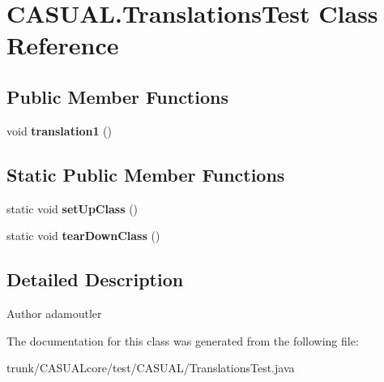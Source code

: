\hypertarget{classCASUAL_1_1TranslationsTest}{\section{C\-A\-S\-U\-A\-L.\-Translations\-Test Class Reference}
\label{classCASUAL_1_1TranslationsTest}
}
\subsection*{Public Member Functions}
\begin{DoxyCompactItemize}
\item 
\hypertarget{classCASUAL_1_1TranslationsTest_a7a0fd0a580f7479985835b31c4693fb4}{void {\bfseries translation1} ()}\label{classCASUAL_1_1TranslationsTest_a7a0fd0a580f7479985835b31c4693fb4}

\end{DoxyCompactItemize}
\subsection*{Static Public Member Functions}
\begin{DoxyCompactItemize}
\item 
\hypertarget{classCASUAL_1_1TranslationsTest_a996baecd9242ec89d7907086b88257dc}{static void {\bfseries set\-Up\-Class} ()}\label{classCASUAL_1_1TranslationsTest_a996baecd9242ec89d7907086b88257dc}

\item 
\hypertarget{classCASUAL_1_1TranslationsTest_a2642ae0a02b26ffa5b222025f85f9be2}{static void {\bfseries tear\-Down\-Class} ()}\label{classCASUAL_1_1TranslationsTest_a2642ae0a02b26ffa5b222025f85f9be2}

\end{DoxyCompactItemize}


\subsection{Detailed Description}
\begin{DoxyAuthor}{Author}
adamoutler 
\end{DoxyAuthor}


The documentation for this class was generated from the following file\-:\begin{DoxyCompactItemize}
\item 
trunk/\-C\-A\-S\-U\-A\-Lcore/test/\-C\-A\-S\-U\-A\-L/Translations\-Test.\-java\end{DoxyCompactItemize}
